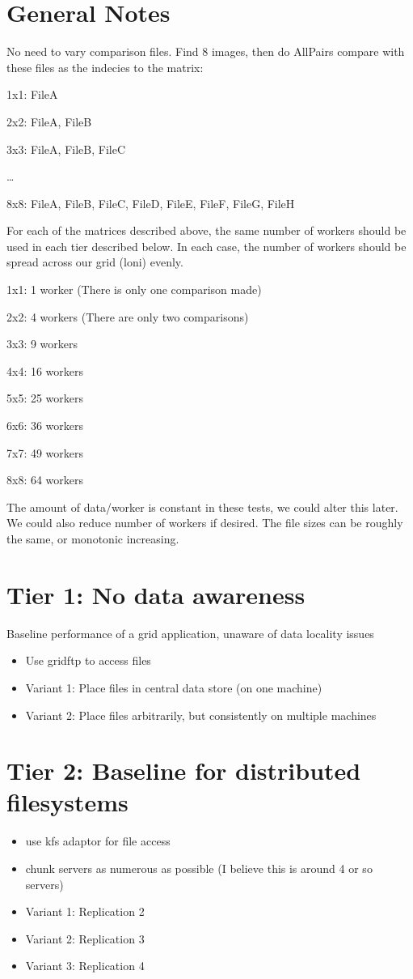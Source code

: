 \documentclass[a4paper,12pt]{article}
\begin{document}
\section{General Notes}
No need to vary comparison files.  Find 8 images, then do AllPairs compare with these files as the indecies to the matrix:

1x1: FileA

2x2: FileA, FileB

3x3: FileA, FileB, FileC

\ldots

8x8: FileA, FileB, FileC, FileD, FileE, FileF, FileG, FileH

For each of the matrices described above, the same number of workers should be used in each tier described below.  In each case, the number of workers should be spread across our grid (loni) evenly.

1x1: 1 worker (There is only one comparison made)

2x2: 4 workers (There are only two comparisons)

3x3: 9 workers

4x4: 16 workers

5x5: 25 workers

6x6: 36 workers

7x7: 49 workers

8x8: 64 workers

The amount of data/worker is constant in these tests, we could alter this later. We could also reduce number of workers if desired.
The file sizes can be roughly the same, or monotonic increasing.

\section{Tier 1: No data awareness}
Baseline performance of a grid application, unaware of data locality issues
\begin{itemize}
\item Use gridftp to access files
\item Variant 1: Place files in central data store (on one machine)
\item Variant 2: Place files arbitrarily, but consistently on multiple machines
\end{itemize}

\section{Tier 2: Baseline for distributed filesystems}
\begin{itemize}
\item use kfs adaptor for file access
\item chunk servers as numerous as possible (I believe this is around 4 or so servers)
\item Variant 1: Replication 2
\item Variant 2: Replication 3
\item Variant 3: Replication 4
\end{itemize}
\end{document}
